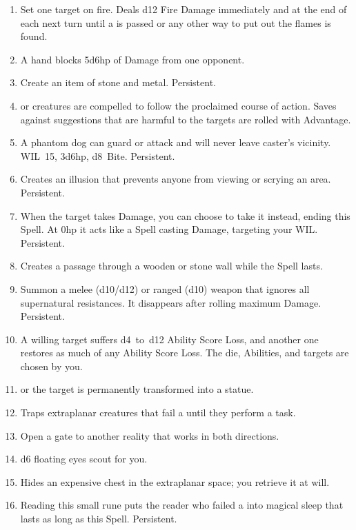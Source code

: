 \documentclass[itdr]{subfiles}
\begin{document}
\begin{enumerate}
	\item {} Set one target on fire. Deals d12 Fire Damage immediately and at the end of each next turn until a  is passed or any other way to put out the flames is found.
	\item {} A hand blocks 5d6hp of Damage from one opponent.
	\item {} Create an item of stone and metal. Persistent.
	\item {}  or creatures are compelled to follow the proclaimed course of action. Saves against suggestions that are harmful to the targets are rolled with Advantage.
	\item {} A phantom dog can guard or attack and will never leave caster's vicinity. WIL~15, 3d6hp, d8~Bite. Persistent.
	\item {} Creates an illusion that prevents anyone from viewing or scrying an area. Persistent.
	\item {} When the target takes Damage, you can choose to take it instead, ending this Spell. At 0hp it acts like a Spell casting Damage, targeting your WIL. Persistent.
	\item {} Creates a passage through a wooden or stone wall while the Spell lasts.
	\item {} Summon a melee (d10/d12) or ranged (d10) weapon that ignores all supernatural resistances. It disappears after rolling maximum Damage. Persistent.
	\item {} A willing target suffers \mbox{d4 to d12} Ability Score Loss, and another one restores as much of any Ability Score Loss. The die, \mbox{Abilities}, and targets are chosen by you.
	\item {}  or the target is permanently transformed into a statue.
	\item {} Traps extraplanar creatures that fail a  until they perform a task.
	\item {} Open a gate to another reality that works in both directions.
	\item {} d6 floating eyes scout for you.
	\item {} Hides an expensive chest in the extraplanar space; you retrieve it at will.
	\item {} Reading this small rune puts the reader who failed a  into magical sleep that lasts as long as this Spell. Persistent.

\end{enumerate}
\end{document}
